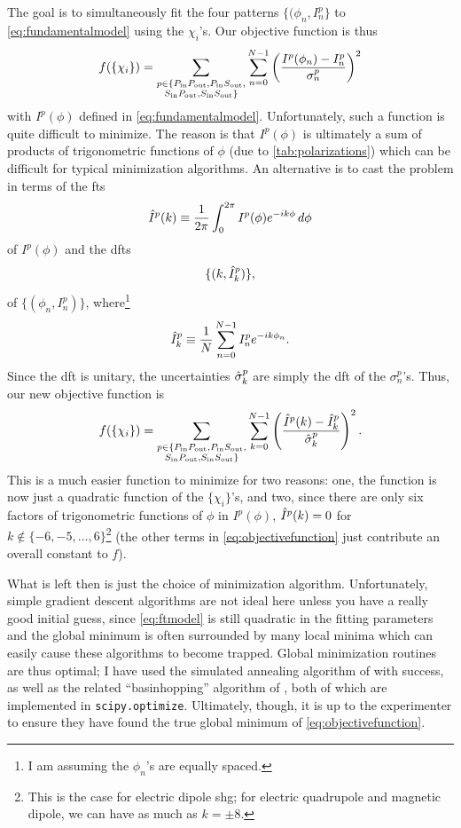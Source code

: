 The goal is to simultaneously fit the four patterns $\{(\phi_n, I^p_n\}$ to \cref{eq:fundamentalmodel} using the $\chi_i$'s.
Our objective function is thus
\begin{equation}
f(\{\chi_i\}) = \sum_{\substack{p\in \{P_\mathrm{in}P_\mathrm{out}, P_\mathrm{in}S_\mathrm{out},\\ S_\mathrm{in}P_\mathrm{out}, S_\mathrm{in}S_\mathrm{out}\}}}\sum_{n=0}^{N-1}\left(\frac{I^p(\phi_n) - I^p_n}{\sigma^p_n}\right)^2
\end{equation}
with $I^p(\phi)$ defined in \cref{eq:fundamentalmodel}.
Unfortunately, such a function is quite difficult to minimize.
The reason is that $I^p(\phi)$ is ultimately a sum of products of trigonometric functions of $\phi$ (due to \cref{tab:polarizations}) which can be difficult for typical minimization algorithms.
An alternative is to cast the problem in terms of the \glspl{ft}
\begin{equation}\label{eq:ftmodel}
\hat{I}^p(k) \equiv \frac{1}{2\pi}\int_0^{2\pi}I^p(\phi)e^{-i k\phi} \, d\phi
\end{equation}
of $I^p(\phi)$ and the \glspl{dft}
\begin{equation}
\{(k, \hat{I}^p_k)\},
\end{equation}
of $\{(\phi_n, I^p_n)\}$, where\footnote{I am assuming the $\phi_n$'s are equally spaced.}
\begin{equation}
\hat{I}^p_k \equiv \frac{1}{N}\sum_{n=0}^{N-1}I^p_n e^{-ik\phi_n}.
\end{equation}
Since the \gls{dft} is unitary, the uncertainties $\hat{\sigma}^p_k$ are simply the \gls{dft} of the $\sigma^p_n$'s.
Thus, our new objective function is
\begin{equation}\label{eq:objectivefunction}
f(\{\chi_i\}) = \sum_{\substack{p\in \{P_\mathrm{in}P_\mathrm{out}, P_\mathrm{in}S_\mathrm{out},\\ S_\mathrm{in}P_\mathrm{out}, S_\mathrm{in}S_\mathrm{out}\}}}\sum_{k=0}^{N-1}\left(\frac{\hat{I}^p(k) - \hat{I}^p_k}{\hat{\sigma}^p_k}\right)^2.
\end{equation}
This is a much easier function to minimize for two reasons: one, the function is now just a quadratic function of the $\{\chi_i\}$'s, and two, since there are only six factors of trigonometric functions of $\phi$ in $I^p(\phi)$, $\hat{I}^p(k) = 0$ for $k \notin \{-6, -5, \ldots, 6\}$\footnote{This is the case for electric dipole \gls{shg}; for electric quadrupole and magnetic dipole, we can have as much as $k = \pm 8$.} (the other terms in \cref{eq:objectivefunction} just contribute an overall constant to $f$).

What is left then is just the choice of minimization algorithm.
Unfortunately, simple gradient descent algorithms are not ideal here unless you have a really good initial guess, since \cref{eq:ftmodel} is still quadratic in the fitting parameters and the global minimum is often surrounded by many local minima which can easily cause these algorithms to become trapped.
Global minimization routines are thus optimal; I have used the simulated annealing algorithm of \citet{xiang_generalized_1997} with success, as well as the related ``basinhopping'' algorithm of \citet{wales_global_1997}, both of which are implemented in \texttt{scipy.optimize}\citep{scipy}.
Ultimately, though, it is up to the experimenter to ensure they have found the true global minimum of \cref{eq:objectivefunction}.

